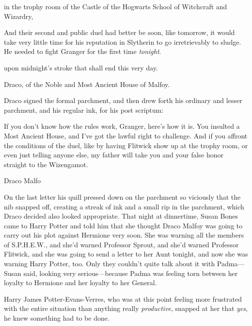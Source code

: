 \begin{writtenNote}
in the trophy room of the Castle of the Hogwarts School of Witchcraft and
Wizardry,
\end{writtenNote}

And their second and public duel had better be soon, like tomorrow, it would
take very little time for his reputation in Slytherin to go irretrievably to
sludge. He needed to fight Granger for the first time \emph{tonight}.

\begin{writtenNote}
upon midnight's stroke that shall end this very day.

Draco, of the Noble and Most Ancient House of Malfoy.
\end{writtenNote}

Draco signed the formal parchment, and then drew forth his ordinary and lesser
parchment, and his regular ink, for his post scriptum:

\begin{writtenNote}
If you don't know how the rules work, Granger, here's how it is. You
insulted a Most Ancient House, and I've got the lawful right to challenge. And
if you affront the conditions of the duel, like by having Flitwick show up at
the trophy room, or even just telling anyone else, my father will take you and
your false honor straight to the Wizengamot.

Draco Malfo
\end{writtenNote}

On the last letter his quill pressed down on the parchment so viciously that
the nib snapped off, creating a streak of ink and a small rip in the parchment,
which Draco decided also looked appropriate.
\sbreak
That night at dinnertime, Susan Bones came to Harry Potter and told him that
she thought Draco Malfoy was going to carry out his plot against Hermione very
soon. She was warning all the members of S.P.H.E.W., and she'd warned Professor
Sprout, and she'd warned Professor Flitwick, and she was going to send a letter
to her Aunt tonight, and now she was warning Harry Potter, too. Only they
couldn't quite talk about it with Padma—Susan said, looking very
serious—because Padma was feeling torn between her loyalty to Hermione and
her loyalty to her General.

Harry James Potter-Evans-Verres, who was at this point feeling more frustrated
with the entire situation than anything really \emph{productive}, snapped at
her that \emph{yes}, he knew something had to be done.

